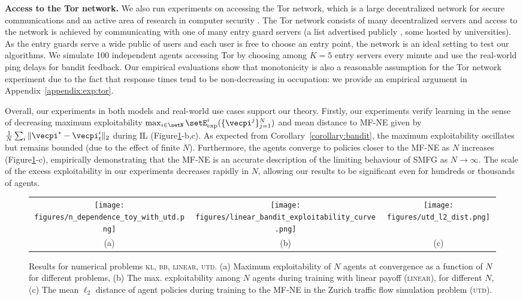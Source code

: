 \textbf{Access to the Tor network.}
We also run experiments on accessing the Tor network, which is a large decentralized network for secure communications and an active area of research in computer security \citep{jansen2014sniper,mccoy2008shining}.
The Tor network consists of many decentralized servers and access to the network is achieved by communicating with one of many entry guard servers (a list advertised publicly \citep{torentryguards}, some hosted by universities).
As the entry guards serve a wide public of users and each user is free to choose an entry point, the network is an ideal setting to test our algorithms.
We simulate 100 independent agents accessing Tor by choosing among $K=5$ entry servers every minute and use the real-world ping delays for bandit feedback.
Our empirical evaluations show that monotonicity is also a reasonable assumption for the Tor network experiment due to the fact that response times tend to be non-decreasing in occupation: we provide an empirical argument in Appendix~\ref{appendix:exp:tor}.

Overall, our experiments in both models and real-world use cases support our theory.
Firstly, our experiments verify learning in the sense of decreasing maximum exploitability $\max_{i\in\setN} \setE^i_{\text{exp}}(\{\vecpi^j\}_{j=1}^N)$ and mean distance to MF-NE given by $\frac{1}{N}\sum_i \|\vecpi^* - \vecpi^i_t\|_2$ during IL (Figure\ref{figure:main}-b,c).
As expected from Corollary~\ref{corollary:bandit}, the maximum exploitability oscillates but remains bounded (due to the effect of finite $N$).
Furthermore, the agents converge to policies closer to the MF-NE as $N$ increases (Figure\ref{figure:main}-c), empirically demonstrating that the MF-NE is an accurate description of the limiting behaviour of SMFG as $N\rightarrow\infty$.
The scale of the excess exploitability in our experiments decreases rapidly in $N$, allowing our results to be significant even for hundreds or thousands of agents.

\begin{figure}[h]
\begin{tabular}{ccc}
  \texttt{[image: figures/n\_dependence\_toy\_with\_utd.png]} & 
  \texttt{[image: figures/linear\_bandit\_exploitability\_curve.png]} &   
  \texttt{[image: figures/utd\_l2\_dist.png]} \\
(a) & (b) & (c)
\end{tabular}
\caption{
Results for numerical problems \textsc{kl}, \textsc{bb}, \textsc{linear}, \textsc{utd}.
(a) Maximum exploitability of $N$ agents at convergence as a function of $N$ for different problems,
(b) The max. exploitability among $N$ agents during training with linear payoff (\textsc{linear}), for different $N$,
(c) The mean $\ell_2$ distance of agent policies during training to the MF-NE in the Zurich traffic flow simulation problem (\textsc{utd}).
}
\label{figure:main}
\end{figure}

